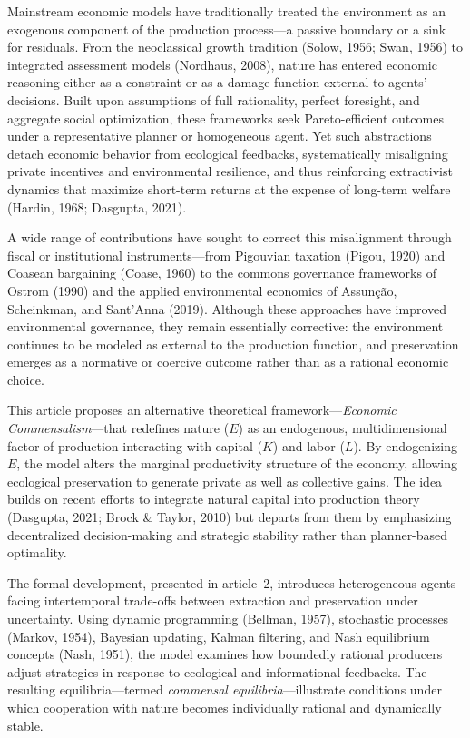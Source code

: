 \documentclass[a4paper,12pt,oneside,brazil,english]{abntex2}
\begin{document}
Mainstream economic models have traditionally treated the environment as an exogenous component of the production process---a passive boundary or a sink for residuals. From the neoclassical growth tradition (Solow, 1956; Swan, 1956) to integrated assessment models (Nordhaus, 2008), nature has entered economic reasoning either as a constraint or as a damage function external to agents’ decisions. Built upon assumptions of full rationality, perfect foresight, and aggregate social optimization, these frameworks seek Pareto-efficient outcomes under a representative planner or homogeneous agent. Yet such abstractions detach economic behavior from ecological feedbacks, systematically misaligning private incentives and environmental resilience, and thus reinforcing extractivist dynamics that maximize short-term returns at the expense of long-term welfare (Hardin, 1968; Dasgupta, 2021).

A wide range of contributions have sought to correct this misalignment through fiscal or institutional instruments---from Pigouvian taxation (Pigou, 1920) and Coasean bargaining (Coase, 1960) to the commons governance frameworks of Ostrom (1990) and the applied environmental economics of Assunção, Scheinkman, and Sant’Anna (2019). Although these approaches have improved environmental governance, they remain essentially corrective: the environment continues to be modeled as external to the production function, and preservation emerges as a normative or coercive outcome rather than as a rational economic choice.

This article proposes an alternative theoretical framework---\textit{Economic Commensalism}---that redefines nature ($E$) as an endogenous, multidimensional factor of production interacting with capital ($K$) and labor ($L$). By endogenizing $E$, the model alters the marginal productivity structure of the economy, allowing ecological preservation to generate private as well as collective gains. The idea builds on recent efforts to integrate natural capital into production theory (Dasgupta, 2021; Brock \& Taylor, 2010) but departs from them by emphasizing decentralized decision-making and strategic stability rather than planner-based optimality.

The formal development, presented in article~2, introduces heterogeneous agents facing intertemporal trade-offs between extraction and preservation under uncertainty. Using dynamic programming (Bellman, 1957), stochastic processes (Markov, 1954), Bayesian updating, Kalman filtering, and Nash equilibrium concepts (Nash, 1951), the model examines how boundedly rational producers adjust strategies in response to ecological and informational feedbacks. The resulting equilibria---termed \textit{commensal equilibria}---illustrate conditions under which cooperation with nature becomes individually rational and dynamically stable.
\end{document}
